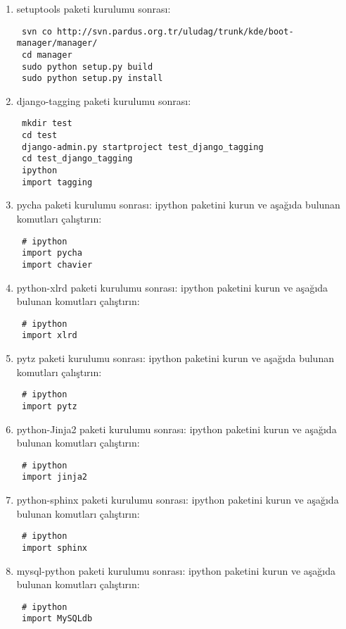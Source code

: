 \documentclass[a4paper,10pt]{article}
\begin{document}
\begin{enumerate}
\item setuptools paketi kurulumu sonrası:
\begin{verbatim}
 svn co http://svn.pardus.org.tr/uludag/trunk/kde/boot-manager/manager/
 cd manager
 sudo python setup.py build 
 sudo python setup.py install
\end{verbatim}

\item django-tagging paketi kurulumu sonrası:
\begin{verbatim}
 mkdir test
 cd test
 django-admin.py startproject test_django_tagging
 cd test_django_tagging
 ipython
 import tagging
\end{verbatim}

\item pycha paketi kurulumu sonrası:
ipython paketini kurun ve aşağıda bulunan komutları çalıştırın:
\begin{verbatim}
 # ipython
 import pycha
 import chavier
\end{verbatim}

\item python-xlrd paketi kurulumu sonrası:
ipython paketini kurun ve aşağıda bulunan komutları çalıştırın:
\begin{verbatim}
 # ipython
 import xlrd
\end{verbatim}

\item pytz paketi kurulumu sonrası:
ipython paketini kurun ve aşağıda bulunan komutları çalıştırın:
\begin{verbatim}
 # ipython
 import pytz
\end{verbatim}

\item python-Jinja2 paketi kurulumu sonrası:
ipython paketini kurun ve aşağıda bulunan komutları çalıştırın:
\begin{verbatim}
 # ipython
 import jinja2
\end{verbatim}

\item python-sphinx paketi kurulumu sonrası:
ipython paketini kurun ve aşağıda bulunan komutları çalıştırın:
\begin{verbatim}
 # ipython
 import sphinx
\end{verbatim}


\item mysql-python paketi kurulumu sonrası:
ipython paketini kurun ve aşağıda bulunan komutları çalıştırın:
\begin{verbatim}
 # ipython
 import MySQLdb
\end{verbatim}


\end{enumerate}
\end{document}
